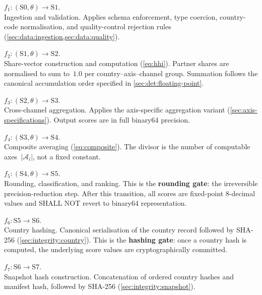 \begin{description}[style=nextline, leftmargin=4em, labelwidth=3.5em]

  \item[\textbf{T1}] \(f_1 : (\mathrm{S0}, \theta) \to \mathrm{S1}\).\\
    Ingestion and validation.  Applies schema enforcement, type coercion,
    country-code normalisation, and quality-control rejection rules
    (\cref{sec:data:ingestion,sec:data:quality}).

  \item[\textbf{T2}] \(f_2 : (\mathrm{S1}, \theta) \to \mathrm{S2}\).\\
    Share-vector construction and \HHI computation
    (\cref{eq:hhi}).  Partner shares are normalised to sum to~\(1.0\) per
    country--axis--channel group.  Summation follows the canonical
    accumulation order specified in \cref{sec:det:floating-point}.

  \item[\textbf{T3}] \(f_3 : (\mathrm{S2}, \theta) \to \mathrm{S3}\).\\
    Cross-channel aggregation.  Applies the axis-specific aggregation
    variant (\cref{sec:axis-specifications}).  Output scores are in full
    binary64 precision.

  \item[\textbf{T4}] \(f_4 : (\mathrm{S3}, \theta) \to \mathrm{S4}\).\\
    Composite averaging (\cref{eq:composite}).  The divisor is the number
    of computable axes~\(|\mathcal{A}_i|\), not a fixed constant.

  \item[\textbf{T5}] \(f_5 : (\mathrm{S4}, \theta) \to \mathrm{S5}\).\\
    Rounding, classification, and ranking.  This is the \textbf{rounding
    gate}: the irreversible precision-reduction step.  After this
    transition, all scores are fixed-point 8-decimal values and SHALL NOT
    revert to binary64 representation.

  \item[\textbf{T6}] \(f_6 : \mathrm{S5} \to \mathrm{S6}\).\\
    Country hashing.  Canonical serialisation of the country record
    followed by SHA-256 (\cref{sec:integrity:country}).  This is the
    \textbf{hashing gate}: once a country hash is computed, the underlying
    score values are cryptographically committed.

  \item[\textbf{T7}] \(f_7 : \mathrm{S6} \to \mathrm{S7}\).\\
    Snapshot hash construction.  Concatenation of ordered country hashes
    and manifest hash, followed by SHA-256
    (\cref{sec:integrity:snapshot}).


\end{description}
